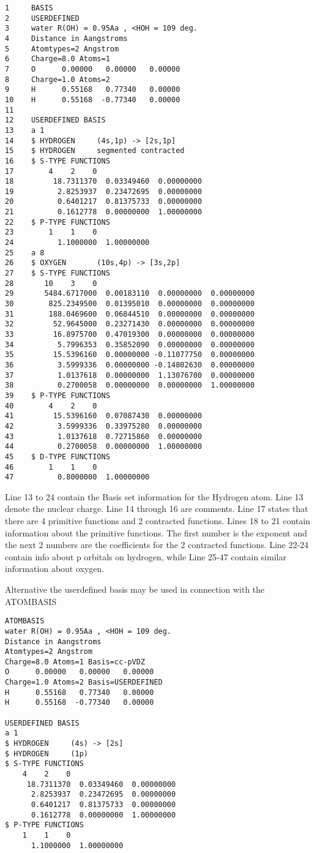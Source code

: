 \begin{verbatim}
1     BASIS
2     USERDEFINED
3     water R(OH) = 0.95Aa , <HOH = 109 deg.
4     Distance in Aangstroms
5     Atomtypes=2 Angstrom
6     Charge=8.0 Atoms=1
7     O      0.00000   0.00000   0.00000
8     Charge=1.0 Atoms=2
9     H      0.55168   0.77340   0.00000
10    H      0.55168  -0.77340   0.00000
11 
12    USERDEFINED BASIS
13    a 1
14    $ HYDROGEN     (4s,1p) -> [2s,1p]
15    $ HYDROGEN     segmented contracted
16    $ S-TYPE FUNCTIONS
17        4    2    0
18         18.7311370  0.03349460  0.00000000
19          2.8253937  0.23472695  0.00000000
20          0.6401217  0.81375733  0.00000000
21          0.1612778  0.00000000  1.00000000
22    $ P-TYPE FUNCTIONS
23        1    1    0
24          1.1000000  1.00000000
25    a 8
26    $ OXYGEN       (10s,4p) -> [3s,2p]                               
27    $ S-TYPE FUNCTIONS
28       10    3    0
29       5484.6717000  0.00183110  0.00000000  0.00000000
30        825.2349500  0.01395010  0.00000000  0.00000000
31        188.0469600  0.06844510  0.00000000  0.00000000
32         52.9645000  0.23271430  0.00000000  0.00000000
33         16.8975700  0.47019300  0.00000000  0.00000000
34          5.7996353  0.35852090  0.00000000  0.00000000
35         15.5396160  0.00000000 -0.11077750  0.00000000
36          3.5999336  0.00000000 -0.14802630  0.00000000
37          1.0137618  0.00000000  1.13076700  0.00000000
38          0.2700058  0.00000000  0.00000000  1.00000000
39    $ P-TYPE FUNCTIONS
40        4    2    0
41         15.5396160  0.07087430  0.00000000
42          3.5999336  0.33975280  0.00000000
43          1.0137618  0.72715860  0.00000000
44          0.2700058  0.00000000  1.00000000
45    $ D-TYPE FUNCTIONS
46        1    1    0
47          0.8000000  1.00000000
\end{verbatim} 
Line 13 to 24 contain the Basis set information for the Hydrogen atom. 
Line 13 denote the nuclear charge. Line 14 through 16 are comments. Line 17 states 
that there are 4 primitive functions and 2 contracted functions.
Lines 18 to 21 contain information about the primitive functions. The first number is the exponent 
and the next 2 numbers are the coefficients for the 2 contracted functions.
Line 22-24 contain info about p orbitals on hydrogen, while Line 25-47 contain similar information 
about oxygen.

Alternative the userdefined basis may be used in connection with the ATOMBASIS
\begin{verbatim}
ATOMBASIS
water R(OH) = 0.95Aa , <HOH = 109 deg.
Distance in Aangstroms
Atomtypes=2 Angstrom
Charge=8.0 Atoms=1 Basis=cc-pVDZ
O      0.00000   0.00000   0.00000
Charge=1.0 Atoms=2 Basis=USERDEFINED
H      0.55168   0.77340   0.00000
H      0.55168  -0.77340   0.00000

USERDEFINED BASIS
a 1
$ HYDROGEN     (4s) -> [2s]                                      
$ HYDROGEN     (1p)                                              
$ S-TYPE FUNCTIONS
    4    2    0
     18.7311370  0.03349460  0.00000000
      2.8253937  0.23472695  0.00000000
      0.6401217  0.81375733  0.00000000
      0.1612778  0.00000000  1.00000000
$ P-TYPE FUNCTIONS
    1    1    0
      1.1000000  1.00000000
\end{verbatim}

